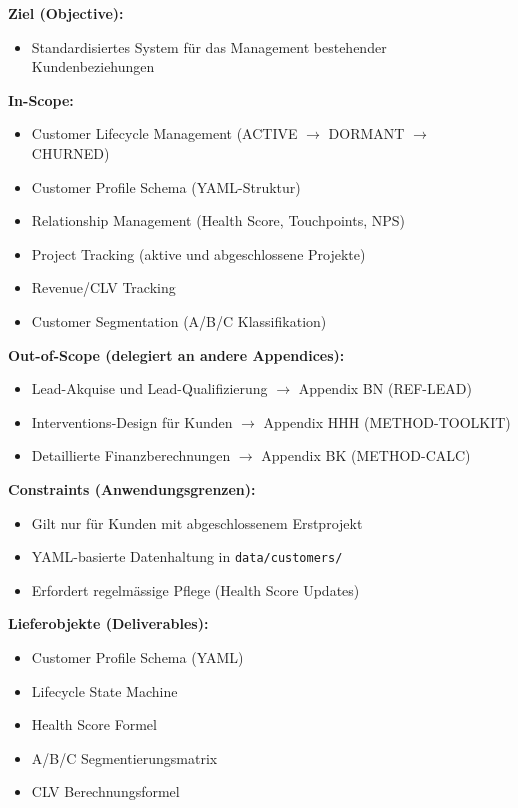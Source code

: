 \begin{tcolorbox}[
    colback=orange!5!white,
    colframe=orange!75!black,
    title={\textbf{Appendix Scope: Ziel / In-Scope / Out-of-Scope / Constraints}},
    fonttitle=\bfseries
]

\textbf{Ziel (Objective):}
\begin{itemize}[nosep]
    \item Standardisiertes System für das Management bestehender Kundenbeziehungen
\end{itemize}

\textbf{In-Scope:}
\begin{itemize}[nosep]
    \item Customer Lifecycle Management (ACTIVE $\rightarrow$ DORMANT $\rightarrow$ CHURNED)
    \item Customer Profile Schema (YAML-Struktur)
    \item Relationship Management (Health Score, Touchpoints, NPS)
    \item Project Tracking (aktive und abgeschlossene Projekte)
    \item Revenue/CLV Tracking
    \item Customer Segmentation (A/B/C Klassifikation)
\end{itemize}

\textbf{Out-of-Scope (delegiert an andere Appendices):}
\begin{itemize}[nosep]
    \item Lead-Akquise und Lead-Qualifizierung $\rightarrow$ Appendix BN (REF-LEAD)
    \item Interventions-Design für Kunden $\rightarrow$ Appendix HHH (METHOD-TOOLKIT)
    \item Detaillierte Finanzberechnungen $\rightarrow$ Appendix BK (METHOD-CALC)
\end{itemize}

\textbf{Constraints (Anwendungsgrenzen):}
\begin{itemize}[nosep]
    \item Gilt nur für Kunden mit abgeschlossenem Erstprojekt
    \item YAML-basierte Datenhaltung in \texttt{data/customers/}
    \item Erfordert regelmässige Pflege (Health Score Updates)
\end{itemize}

\textbf{Lieferobjekte (Deliverables):}
\begin{itemize}[nosep]
    \item Customer Profile Schema (YAML)
    \item Lifecycle State Machine
    \item Health Score Formel
    \item A/B/C Segmentierungsmatrix
    \item CLV Berechnungsformel
\end{itemize}

\end{tcolorbox}


